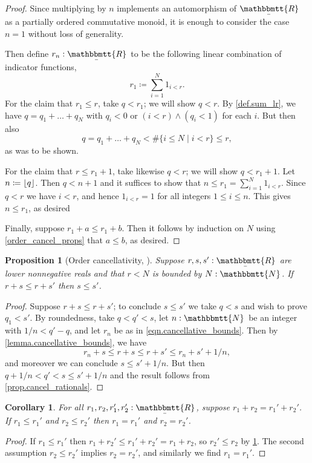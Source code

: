 \documentclass[reqno,11pt]{amsproc}
\theoremstyle{plain}
\newtheorem{proposition}[theorem]{Proposition}
\newtheorem{corollary}[theorem]{Corollary}
\theoremstyle{definition}
\DeclarePairedDelimiter{\floor}{\lfloor}{\rfloor}
\newcommand{\ubar}[1]{\underaccent{\bar}{#1}}
\newcommand{\ind}[1]{1_{#1}}			%
\newcommand{\internal}[1]{\raisebox{-.03ex}{$\mathbbmtt{#1}$}}
\newcommand{\hs}{\hspace{1pt}}
\newcommand{\tnn}{\internal{N}\hs}
\newcommand{\trr}{\internal{R}}
\newcommand{\tlrr}{\ubar{\trr}\hs}
\numberwithin{equation}{section}
\begin{document}
\begin{proof}
	Since multiplying by $n$ implements an automorphism of $\tlrr$ as a partially ordered commutative monoid, it is enough to consider the case $n = 1$ without loss of generality.

	Then define $r_n:\tlrr$ to be the following linear combination of indicator functions,
	\begin{equation}
		\label{eqn.cancellative_bounds}
		r_1 \coloneqq \sum_{i=1}^{N} \ind{i < r}.
	\end{equation}
	For the claim that $r_1\leq r$, take $q < r_1$; we will show $q < r$. By \cref{def.sum_lr}, we have $q = q_1 + \ldots + q_N$ with $q_i < 0$ or $(i < r) \land (q_i < 1)$ for each $i$. But then also
	\[
		q = q_1 + \ldots + q_N < \#\{ i \le N \mid i < r \} \le r,
	\]
	as was to be shown.

	For the claim that $r\leq r_1+1$, take likewise $q<r$; we will show $q < r_1 + 1$. Let $n \coloneqq \floor{q}$.  Then $q < n + 1$ and it suffices to show that $n \leq r_1 = \sum_{i=1}^{N} \ind{i < r}$. Since $q < r$ we have $i < r$, and hence $\ind{i < r} = 1$ for all integers $1\leq i\leq n$. This gives $n\leq r_1$, as desired

	Finally, suppose $r_1 + a \leq r_1 + b$. Then it follows by induction on $N$ using \cref{order_cancel_props} that $a\leq b$, as desired.
\end{proof}

\begin{proposition}[Order cancellativity, \cite{henry2012simplification}]\label{cor.order_cancel}
	Suppose $r,s,s':\tlrr$ are lower nonnegative reals and that $r<N$ is bounded by $N:\tnn$. If $r+s\leq r+s'$ then $s\leq s'$.
\end{proposition}

\begin{proof}
Suppose $r+s\leq r+s'$; to conclude $s\leq s'$ we take $q<s$ and wish to prove $q_1<s'$. By roundedness, take $q<q'<s$, let $n:\tnn$ be an integer with $1/n<q'-q$, and let $r_n$ be as in \eqref{eqn.cancellative_bounds}. Then by \cref{lemma.cancellative_bounds}, we have 
\[r_n+s\leq r+s\leq r+s'\leq r_n+s'+1/n,\]
and moreover we can conclude $s\leq s'+1/n$. But then $q+1/n<q'<s\leq s'+1/n$ and the result follows from \cref{prop.cancel_rationals}.
\end{proof}

\begin{corollary}\label{cor.favorite}
For all $r_1,r_2,r_1',r_2':\tlrr$, suppose $r_1+r_2=r_1'+r_2'$. If $r_1\leq r_1'$ and $r_2\leq r_2'$ then $r_1=r_1'$ and $r_2=r_2'$.
\end{corollary}
\begin{proof}
If $r_1\leq r_1'$ then $r_1+r_2'\leq r_1'+r_2'=r_1+r_2$, so $r_2'\leq r_2$ by \cref{cor.order_cancel}. The second assumption $r_2\leq r_2'$ implies $r_2=r_2'$, and similarly we find $r_1=r_1'$.
\end{proof}
\end{document}
